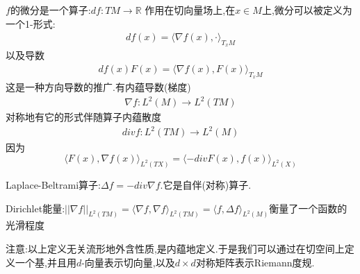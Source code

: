 \documentclass{article}
\begin{document}
$f$的微分是一个算子:$df:TM\rightarrow \mathbb{R}$
作用在切向量场上,在$x\in M$上,微分可以被定义为一个1-形式:
\begin{align}
    df(x)=\langle \nabla f(x), \cdot \rangle_{T_x M}
\end{align}
以及导数
\begin{align}
    df(x)F(x)=\langle \nabla f(x), F(x) \rangle_{T_x M}
\end{align}
这是一种方向导数的推广.有内蕴导数(梯度)
\begin{align}
    \nabla f:L^2(M)\rightarrow L^2(TM)
\end{align}
对称地有它的形式伴随算子内蕴散度
\begin{align}
    div f :L^2(TM)\rightarrow L^2(M)
\end{align}
因为$$\langle F(x), \nabla f(x) \rangle_{L^2(TX)}=\langle -div F(x), f(x) \rangle_{L^2(X)}$$

Laplace-Beltrami算子:$\Delta f=-div \nabla f$.它是自伴(对称)算子.

Dirichlet能量:$||\nabla f||_{L^2(TM)}=\langle \nabla f, \nabla f \rangle_{L^2(TM)}=\langle f, \Delta f \rangle_{L^2(M)}$衡量了一个函数的光滑程度

注意:以上定义无关流形地外含性质,是内蕴地定义.于是我们可以通过在切空间上定义一个基,并且用$d$-向量表示切向量,以及$d\times d$对称矩阵表示Riemann度规.
\end{document}
